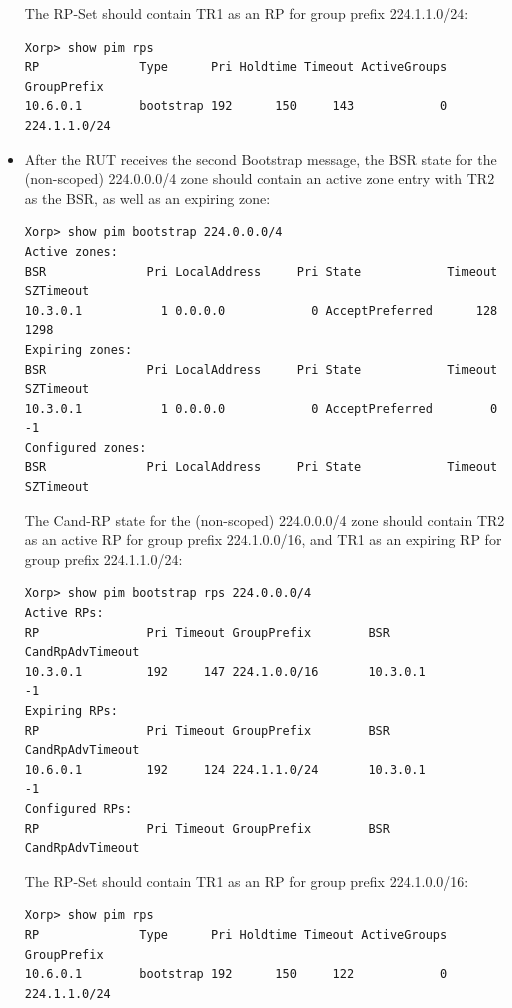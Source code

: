 \documentclass[11pt]{report}
\begin{document}
\begin{itemize}
  The RP-Set should contain TR1 as an RP for group prefix 224.1.1.0/24:

\begin{verbatim}
Xorp> show pim rps 
RP              Type      Pri Holdtime Timeout ActiveGroups GroupPrefix       
10.6.0.1        bootstrap 192      150     143            0 224.1.1.0/24      
\end{verbatim}

  \item After the RUT receives the second Bootstrap message, the BSR state for
  the (non-scoped) 224.0.0.0/4 zone should contain an active zone entry with
  TR2 as the BSR, as well as an expiring zone:

\begin{verbatim}
Xorp> show pim bootstrap 224.0.0.0/4
Active zones:
BSR              Pri LocalAddress     Pri State            Timeout SZTimeout
10.3.0.1           1 0.0.0.0            0 AcceptPreferred      128      1298
Expiring zones:
BSR              Pri LocalAddress     Pri State            Timeout SZTimeout
10.3.0.1           1 0.0.0.0            0 AcceptPreferred        0        -1
Configured zones:
BSR              Pri LocalAddress     Pri State            Timeout SZTimeout
\end{verbatim}

  The Cand-RP state for the (non-scoped) 224.0.0.0/4 zone should
  contain TR2 as an active RP for group prefix 224.1.0.0/16, and TR1 as an
  expiring RP for group prefix 224.1.1.0/24:

\begin{verbatim}
Xorp> show pim bootstrap rps 224.0.0.0/4
Active RPs:
RP               Pri Timeout GroupPrefix        BSR         CandRpAdvTimeout
10.3.0.1         192     147 224.1.0.0/16       10.3.0.1                  -1
Expiring RPs:
RP               Pri Timeout GroupPrefix        BSR         CandRpAdvTimeout
10.6.0.1         192     124 224.1.1.0/24       10.3.0.1                  -1
Configured RPs:
RP               Pri Timeout GroupPrefix        BSR         CandRpAdvTimeout
\end{verbatim}

  The RP-Set should contain TR1 as an RP for group prefix 224.1.0.0/16:

\begin{verbatim}
Xorp> show pim rps 
RP              Type      Pri Holdtime Timeout ActiveGroups GroupPrefix       
10.6.0.1        bootstrap 192      150     122            0 224.1.1.0/24      
\end{verbatim}


\end{itemize}
\end{document}
